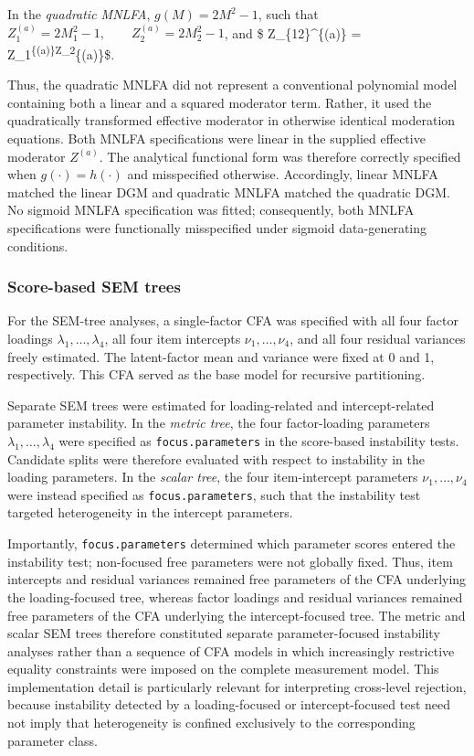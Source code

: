 \documentclass[
  man,
  floatsintext]{apa7}
\begin{document}
In the \emph{quadratic MNLFA}, \(g(M)=2M^2-1\), such that
\(Z_1^{(a)}=2M_1^2-1, \qquad Z_2^{(a)}=2M_2^2-1\), and \$
Z\_\{12\}\^{}\{(a)\} = Z\_1\textsuperscript{\{(a)\}Z\_2}\{(a)\}\$.

Thus, the quadratic MNLFA did not represent a conventional polynomial
model containing both a linear and a squared moderator term. Rather, it
used the quadratically transformed effective moderator in otherwise
identical moderation equations. Both MNLFA specifications were linear in
the supplied effective moderator \(Z^{(a)}\). The analytical functional
form was therefore correctly specified when \(g(\cdot)=h(\cdot)\) and
misspecified otherwise. Accordingly, linear MNLFA matched the linear DGM
and quadratic MNLFA matched the quadratic DGM. No sigmoid MNLFA
specification was fitted; consequently, both MNLFA specifications were
functionally misspecified under sigmoid data-generating conditions.

\subsubsection{Score-based SEM trees}\label{score-based-sem-trees}

For the SEM-tree analyses, a single-factor CFA was specified with all
four factor loadings \(\lambda_1,\ldots,\lambda_4\), all four item
intercepts \(\nu_1,\ldots,\nu_4\), and all four residual variances
freely estimated. The latent-factor mean and variance were fixed at 0
and 1, respectively. This CFA served as the base model for recursive
partitioning.

Separate SEM trees were estimated for loading-related and
intercept-related parameter instability. In the \emph{metric tree}, the
four factor-loading parameters \(\lambda_1,\ldots,\lambda_4\) were
specified as \texttt{focus.parameters} in the score-based instability
tests. Candidate splits were therefore evaluated with respect to
instability in the loading parameters. In the \emph{scalar tree}, the
four item-intercept parameters \(\nu_1,\ldots,\nu_4\) were instead
specified as \texttt{focus.parameters}, such that the instability test
targeted heterogeneity in the intercept parameters.

Importantly, \texttt{focus.parameters} determined which parameter scores
entered the instability test; non-focused free parameters were not
globally fixed. Thus, item intercepts and residual variances remained
free parameters of the CFA underlying the loading-focused tree, whereas
factor loadings and residual variances remained free parameters of the
CFA underlying the intercept-focused tree. The metric and scalar SEM
trees therefore constituted separate parameter-focused instability
analyses rather than a sequence of CFA models in which increasingly
restrictive equality constraints were imposed on the complete
measurement model. This implementation detail is particularly relevant
for interpreting cross-level rejection, because instability detected by
a loading-focused or intercept-focused test need not imply that
heterogeneity is confined exclusively to the corresponding parameter
class.
\end{document}
